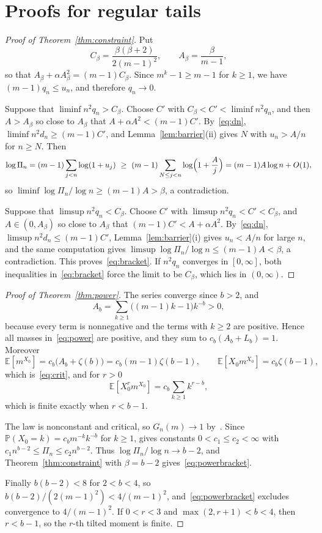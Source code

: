 \documentclass[11pt]{amsart}
\theoremstyle{remark}
\numberwithin{equation}{section}
\newcommand{\PP}{\mathbb{P}}
\newcommand{\EE}{\mathbb{E}}
\begin{document}
\section{Proofs for regular tails}\label{sec:proofs}
\begin{proof}[Proof of Theorem~\ref{thm:constraint}]
Put
\[
C_\beta=\frac{\beta(\beta+2)}{2(m-1)^2},\qquad A_\beta=\frac{\beta}{m-1},
\]
so that $A_\beta+\alpha A_\beta^2=(m-1)C_\beta$. Since $m^k-1\ge m-1$ for $k\ge1$, we have $(m-1)q_n\le u_n$, and therefore $q_n\to0$.

Suppose that $\liminf n^2q_n>C_\beta$. Choose $C'$ with $C_\beta<C'<\liminf n^2q_n$, and then $A>A_\beta$ so close to $A_\beta$ that $A+\alpha A^2<(m-1)C'$. By~\eqref{eq:dn}, $\liminf n^2d_n\ge(m-1)C'$, and Lemma~\ref{lem:barrier}(ii) gives $N$ with $u_n>A/n$ for $n\ge N$. Then
\[
\log\Pi_n=(m-1)\sum_{j<n}\log(1+u_j)\ \ge\ (m-1)\sum_{N\le j<n}\log\Bigl(1+\frac Aj\Bigr)=(m-1)A\log n+O(1),
\]
so $\liminf\log\Pi_n/\log n\ge(m-1)A>\beta$, a contradiction.

Suppose that $\limsup n^2q_n<C_\beta$. Choose $C'$ with $\limsup n^2q_n<C'<C_\beta$, and $A\in(0,A_\beta)$ so close to $A_\beta$ that $(m-1)C'<A+\alpha A^2$. By~\eqref{eq:dn}, $\limsup n^2d_n\le(m-1)C'$, Lemma~\ref{lem:barrier}(i) gives $u_n<A/n$ for large $n$, and the same computation gives $\limsup\log\Pi_n/\log n\le(m-1)A<\beta$, a contradiction. This proves~\eqref{eq:bracket}. If $n^2q_n$ converges in $[0,\infty]$, both inequalities in~\eqref{eq:bracket} force the limit to be $C_\beta$, which lies in $(0,\infty)$.
\end{proof}

\begin{proof}[Proof of Theorem~\ref{thm:power}]
The series converge since $b>2$, and
\[
A_b=\sum_{k\ge1}\bigl((m-1)k-1\bigr)k^{-b}>0,
\]
because every term is nonnegative and the terms with $k\ge2$ are positive. Hence all masses in~\eqref{eq:power} are positive, and they sum to $c_b(A_b+L_b)=1$. Moreover
\[
\EE[m^{X_0}]=c_b\bigl(A_b+\zeta(b)\bigr)=c_b(m-1)\zeta(b-1),\qquad \EE[X_0m^{X_0}]=c_b\zeta(b-1),
\]
which is~\eqref{eq:crit}, and for $r>0$
\[
\EE[X_0^rm^{X_0}]=c_b\sum_{k\ge1}k^{r-b},
\]
which is finite exactly when $r<b-1$.

The law is nonconstant and critical, so $G_n(m)\to1$ by~\cite[Theorem~2]{CDHLS}. Since $\PP(X_0=k)=c_bm^{-k}k^{-b}$ for $k\ge1$, \cite[Theorem~1.1]{CS} gives constants $0<c_1\le c_2<\infty$ with $c_1n^{b-2}\le\Pi_n\le c_2n^{b-2}$. Thus $\log\Pi_n/\log n\to b-2$, and Theorem~\ref{thm:constraint} with $\beta=b-2$ gives~\eqref{eq:powerbracket}.

Finally $b(b-2)<8$ for $2<b<4$, so $b(b-2)/(2(m-1)^2)<4/(m-1)^2$, and~\eqref{eq:powerbracket} excludes convergence to $4/(m-1)^2$. If $0<r<3$ and $\max(2,r+1)<b<4$, then $r<b-1$, so the $r$-th tilted moment is finite.
\end{proof}
\end{document}
